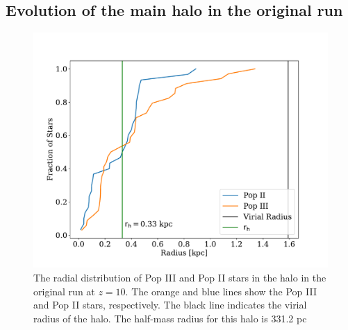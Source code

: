 \documentclass[fleqn,usenatbib]{mnras}
\begin{document}
\subsection{Evolution of the main halo in the original run} \label{sec:main_halo}
\begin{figure} 
	\includegraphics[width=\columnwidth]{plots/run_OG_stellar_dist.pdf}
	\caption[Radial distribution of Pop II and III stars in the main halo.]{The radial distribution of Pop III and Pop II stars in the halo in the original run at $z = 10$. The orange and blue lines show the Pop III and Pop II stars, respectively. The black line indicates the virial radius of the halo. The half-mass radius for this halo is 331.2 pc}
	\label{fig:og_stellarmass}
\end{figure}
\end{document}
